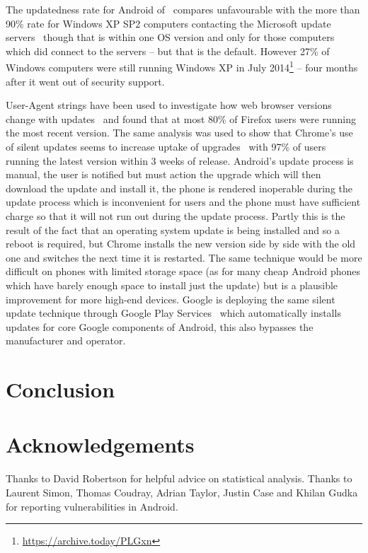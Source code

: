 \documentclass[conference,a4paper,twoside]{IEEEtran}
\let\OldTodo\todo
\renewcommand{\todo}{\OldTodo[inline]}
\begin{document}
The updatedness rate for Android of \daUpdatednessPerc\ compares unfavourable with the more than 90\% rate for Windows XP SP2 computers contacting the Microsoft update servers~\cite{Gkantsidis2006} though that is within one OS version and only for those computers which did connect to the servers -- but that is the default.
However 27\% of Windows computers were still running Windows XP in July 2014\footnote{\url{https://archive.today/PLGxn}} -- four months after it went out of security support.

User-Agent strings have been used to investigate how web browser versions change with updates~\cite{Frei2008} and found that at most 80\% of Firefox users were running the most recent version.
The same analysis was used to show that Chrome's use of silent updates seems to increase uptake of upgrades~\cite{Duebendorfer2010} with 97\% of users running the latest version within 3 weeks of release.
Android's update process is manual, the user is notified but must action the upgrade which will then download the update and install it, the phone is rendered inoperable during the update process which is inconvenient for users and the phone must have sufficient charge so that it will not run out during the update process.
Partly this is the result of the fact that an operating system update is being installed and so a reboot is required, but Chrome installs the new version side by side with the old one and switches the next time it is restarted.
The same technique would be more difficult on phones with limited storage space (as for many cheap Android phones which have barely enough space to install just the update) but is a plausible improvement for more high-end devices.
Google is deploying the same silent update technique through Google Play Services~\cite{TODO} which automatically installs updates for core Google components of Android, this also bypasses the manufacturer and operator.



\section{Conclusion}
\label{sec:conclusion}
\todo{Conclude}

\section*{Acknowledgements}
Thanks to David Robertson for helpful advice on statistical analysis.
Thanks to Laurent Simon, Thomas Coudray, Adrian Taylor, Justin Case and Khilan Gudka for reporting vulnerabilities in Android.

\printbibliography
\end{document}
